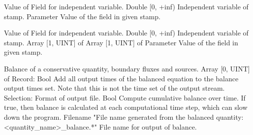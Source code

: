 \begin{TupleType}
	{}
	{} %
	{} %
	{} %
	{{{Value of Field for independent variable.}}}
		\KeyItem
			{}
			{{Double [0, +inf)}}
			{\textrangle}
			{} %
			{{{Independent variable of stamp.}}}
		\KeyItem
			{}
			{{Parameter}}
			{\textrangle}
			{} %
			{{{Value of the field in given stamp.}}}
\end{TupleType}
\begin{TupleType}
	{}
	{} %
	{} %
	{} %
	{{{Value of Field for independent variable.}}}
		\KeyItem
			{}
			{{Double [0, +inf)}}
			{\textrangle}
			{} %
			{{{Independent variable of stamp.}}}
		\KeyItem
			{}
			{{Array [1, UINT] of }{Array [1, UINT] of }{Parameter}}
			{\textrangle}
			{} %
			{{{Value of the field in given stamp.}}}
\end{TupleType}
\begin{RecordType}
	{}
	{} %
	{} %
	{} %
	{{{Balance of a conservative quantity, boundary fluxes and sources.}}}
		\KeyItem
			{}
			{{Array [0, UINT] of }{Record}{: }}
			{\textlangle{ \it{[]} }\textrangle}
			{} %
			{}
		\KeyItem
			{}
			{{Bool}}
			{\textrangle}
			{} %
			{{{Add all output times of the balanced equation to the balance output times set. Note that this is not the time set of the output stream.}}}
		\KeyItem
			{}
			{{Selection}{: }}
			{\textrangle}
			{} %
			{{{Format of output file.}}}
		\KeyItem
			{}
			{{Bool}}
			{\textrangle}
			{} %
			{{{Compute cumulative balance over time. If true, then balance is calculated at each computational time step, which can slow down the program.}}}
		\KeyItem
			{}
			{{Filename}}
			{"{File name generated from the balanced quantity: {\textless}quantity{\_}name{\textgreater}{\_}balance.*}"}
			{} %
			{{{File name for output of balance.}}}
\end{RecordType}
